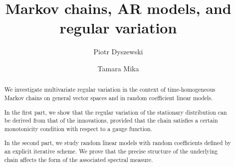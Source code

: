 \documentclass[preprint,12pt]{elsarticle}
\theoremstyle{definition}
\theoremstyle{remark}
\newcommand{\1}{{\mathbf 1}}
\numberwithin{equation}{section}
\begin{document}
\begin{frontmatter}



\title{Markov chains, AR models, and regular variation}

\author[label1]{Piotr Dyszewski } %

\author[label1]{Tamara Mika }



\begin{abstract}
	We investigate multivariate regular variation in the context of 
	time-homogeneous Markov chains on general vector spaces and in random coefficient 
	linear models. 
    
    In the first part, we show that the regular variation of the 
	stationary distribution can be derived from that of the innovations, provided that 
	the chain satisfies a certain monotonicity condition with respect to a gauge 
	function. 

	In the second part, we study random linear models with random coefficients 
	defined by an explicit iterative scheme. We prove that the precise structure of 
	the underlying chain affects the form of the associated spectral measure. 
\end{abstract}


\end{frontmatter}
\end{document}
